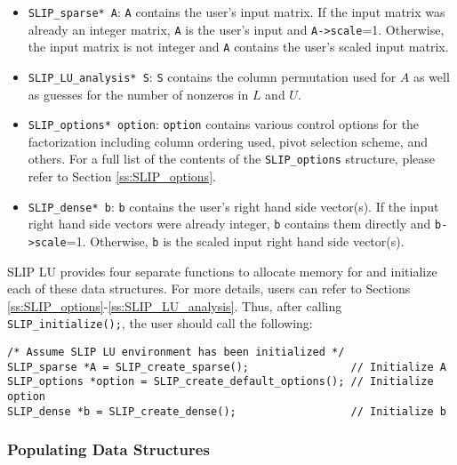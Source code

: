 \documentclass[12pt]{article}
\theoremstyle{definition}
\begin{document}
\begin{itemize}
\item \verb|SLIP_sparse* A|: \verb|A| contains the user's input matrix. If the
input matrix was already an integer matrix, \verb|A| is the user's input and
\verb|A->scale|=1. Otherwise, the input matrix is not integer and \verb|A|
contains the user's scaled input matrix.

\item \verb|SLIP_LU_analysis* S|: \verb|S| contains the column permutation used
for $A$ as well as guesses for the number of nonzeros in $L$ and $U$.

\item \verb|SLIP_options* option|: \verb|option| contains various control
options for the factorization including column ordering used, pivot selection
scheme, and others. For a full list of the contents of the \verb|SLIP_options|
structure, please refer to Section \ref{ss:SLIP_options}.

\item \verb|SLIP_dense* b|: \verb|b| contains the user's right hand side
vector(s). If the input right hand side vectors were already integer, \verb|b|
contains them directly and \verb|b->scale|=1. Otherwise, \verb|b| is the scaled
input right hand side vector(s).
\end{itemize}

SLIP LU provides four separate functions to allocate memory for and initialize
each of these data structures. For more details, users can refer to Sections
\ref{ss:SLIP_options}-\ref{ss:SLIP_LU_analysis}. Thus, after calling
\verb|SLIP_initialize();|, the user should call the following:

{\small
\begin{verbatim}
/* Assume SLIP LU environment has been initialized */
SLIP_sparse *A = SLIP_create_sparse();                // Initialize A
SLIP_options *option = SLIP_create_default_options(); // Initialize option
SLIP_dense *b = SLIP_create_dense();                  // Initialize b
\end{verbatim}
}

\subsubsection{Populating Data Structures}
\end{document}
